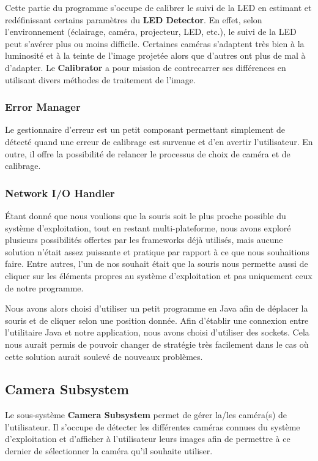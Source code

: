 \documentclass[11pt,a4paper,oldfontcommands]{memoir}
\begin{document}
Cette partie du programme s'occupe de calibrer le suivi de la LED en estimant et redéfinissant certains paramètres du \textbf{LED Detector}. En effet, selon l'environnement (éclairage, caméra, projecteur, LED, etc.), le suivi de la LED peut s'avérer plus ou moins difficile. Certaines caméras s'adaptent très bien à la luminosité et à la teinte de l'image projetée alors que d'autres ont plus de mal à d'adapter. Le \textbf{Calibrator} a pour mission de contrecarrer ses différences en utilisant divers méthodes de traitement de l'image.

\subsubsection{Error Manager}

Le gestionnaire d'erreur est un petit composant permettant simplement de détecté quand une erreur de calibrage est survenue et d'en avertir l'utilisateur. En outre, il offre la possibilité de relancer le processus de choix de caméra et de calibrage.

\subsubsection{Network I/O Handler}

Étant donné que nous voulions que la souris soit le plus proche possible du système d'exploitation, tout en restant multi-plateforme, nous avons exploré plusieurs possibilités offertes par les frameworks déjà utilisés, mais aucune solution n'était assez puissante et pratique par rapport à ce que nous souhaitions faire. Entre autres, l'un de nos souhait était que la souris nous permette aussi de cliquer sur les éléments propres au système d'exploitation et pas uniquement ceux de notre programme.

Nous avons alors choisi d'utiliser un petit programme en Java afin de déplacer la souris et de cliquer selon une position donnée. Afin d'établir une connexion entre l'utilitaire Java et notre application, nous avons choisi d'utiliser des sockets. Cela nous aurait permis de pouvoir changer de stratégie très facilement dans le cas où cette solution aurait soulevé de nouveaux problèmes.

\newpage

\subsection{Camera Subsystem}

Le sous-système \textbf{Camera Subsystem} permet de gérer la/les caméra(s) de l'utilisateur. Il s'occupe de détecter les différentes caméras connues du système d'exploitation et d'afficher à l'utilisateur leurs images afin de permettre à ce dernier de sélectionner la caméra qu'il souhaite utiliser.
\end{document}
